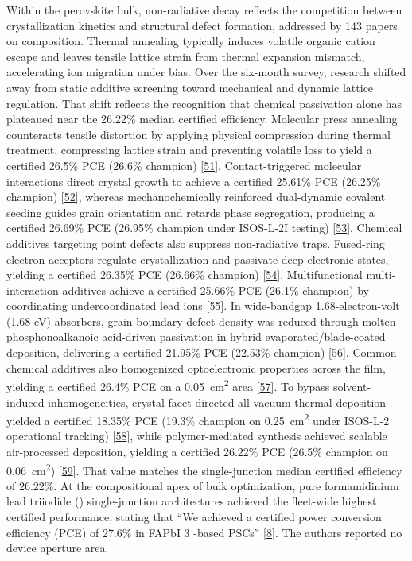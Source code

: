 \documentclass[
  11pt,
]{article}
\begin{document}
Within the perovskite bulk, non-radiative decay reflects the competition
between crystallization kinetics and structural defect formation,
addressed by 143 papers on composition. Thermal annealing typically
induces volatile organic cation escape and leaves tensile lattice strain
from thermal expansion mismatch, accelerating ion migration under bias.
Over the six-month survey, research shifted away from static additive
screening toward mechanical and dynamic lattice regulation. That shift
reflects the recognition that chemical passivation alone has plateaued
near the 26.22\% median certified efficiency. Molecular press annealing
counteracts tensile distortion by applying physical compression during
thermal treatment, compressing lattice strain and preventing volatile
loss to yield a certified 26.5\% PCE (26.6\% champion)
{[}\href{https://doi.org/10.1126/science.aea8228}{51}{]}.
Contact-triggered molecular interactions direct crystal growth to
achieve a certified 25.61\% PCE (26.25\% champion)
{[}\href{https://doi.org/10.1038/s41560-026-02027-4}{52}{]}, whereas
mechanochemically reinforced dual-dynamic covalent seeding guides grain
orientation and retards phase segregation, producing a certified 26.69\%
PCE (26.95\% champion under ISOS-L-2I testing)
{[}\href{https://doi.org/10.1002/adma.72823}{53}{]}. Chemical additives
targeting point defects also suppress non-radiative traps. Fused-ring
electron acceptors regulate crystallization and passivate deep
electronic states, yielding a certified 26.35\% PCE (26.66\% champion)
{[}\href{https://doi.org/10.1021/jacs.5c16976}{54}{]}. Multifunctional
multi-interaction additives achieve a certified 25.66\% PCE (26.1\%
champion) by coordinating undercoordinated lead ions
{[}\href{https://doi.org/10.1021/acs.nanolett.5c05593}{55}{]}. In
wide-bandgap 1.68-electron-volt (1.68-eV) absorbers, grain boundary
defect density was reduced through molten phosphonoalkanoic acid-driven
passivation in hybrid evaporated/blade-coated deposition, delivering a
certified 21.95\% PCE (22.53\% champion)
{[}\href{https://doi.org/10.1002/aenm.202505854}{56}{]}. Common chemical
additives also homogenized optoelectronic properties across the film,
yielding a certified 26.4\% PCE on a \qty{0.05}{\centi\meter\squared}
area {[}\href{https://doi.org/10.1021/jacs.5c18303}{57}{]}. To bypass
solvent-induced inhomogeneities, crystal-facet-directed all-vacuum
thermal deposition yielded a certified 18.35\% PCE (19.3\% champion on
\qty{0.25}{\centi\meter\squared} under ISOS-L-2 operational tracking)
{[}\href{https://doi.org/10.1038/s41563-026-02494-w}{58}{]}, while
polymer-mediated synthesis achieved scalable air-processed deposition,
yielding a certified 26.22\% PCE (26.5\% champion on
\qty{0.06}{\centi\meter\squared})
{[}\href{https://doi.org/10.1002/adma.202522508}{59}{]}. That value
matches the single-junction median certified efficiency of 26.22\%. At
the compositional apex of bulk optimization, pure formamidinium lead
triiodide () single-junction architectures achieved the
fleet-wide highest certified performance, stating that ``We achieved a
certified power conversion efficiency (PCE) of 27.6\% in FAPbI 3 -based
PSCs'' {[}\href{https://doi.org/10.1126/science.aeb9953}{8}{]}. The
authors reported no device aperture area.
\end{document}
